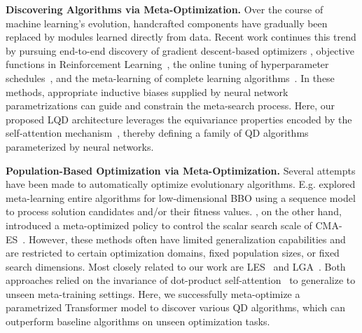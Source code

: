 \textbf{Discovering Algorithms via Meta-Optimization.}
Over the course of machine learning’s evolution, handcrafted components have gradually been replaced by modules learned directly from data.
Recent work continues this trend by pursuing end-to-end discovery of gradient descent-based optimizers \citep{bengio_1992, andrychowicz_2016, metz2019understanding}, objective functions in Reinforcement Learning~\citep{oh2020discovering,xu2020meta,lu2022discovered}, the online tuning of hyperparameter schedules~\citep{xu2018meta,zahavy2020self,parker2022automated}, and the meta-learning of complete learning algorithms~\citep{wang2016learning,kirsch2021meta,kirsch2022introducing}.
In these methods, appropriate inductive biases supplied by neural network parametrizations can guide and constrain the meta-search process. Here, our proposed LQD architecture leverages the equivariance properties encoded by the self-attention mechanism~\citep{lee2019set,kossen2021self,tang_SensoryNeuronTransformer_2021}, thereby defining a family of QD algorithms parameterized by neural networks.

\textbf{Population-Based Optimization via Meta-Optimization.}
Several attempts have been made to automatically optimize evolutionary algorithms. E.g. \citet{chen_2017,tv2019meta, gomes2021meta} explored meta-learning entire algorithms for low-dimensional BBO using a sequence model to process solution candidates and/or their fitness values. \citet{shala2020learning}, on the other hand, introduced a meta-optimized policy to control the scalar search scale of CMA-ES~\citep{hansen2001completely}. However, these methods often have limited generalization capabilities and are restricted to certain optimization domains, fixed population sizes, or fixed search dimensions.
Most closely related to our work are LES~\citep{lange_DiscoveringEvolutionStrategies_2023} and LGA~\citep{lange_DiscoveringAttentionBasedGenetic_2023}. Both approaches relied on the invariance of dot-product self-attention~\citep{lee2019set,tang_SensoryNeuronTransformer_2021} to generalize to unseen meta-training settings.
Here, we successfully meta-optimize a parametrized Transformer model to discover various QD algorithms, which can outperform baseline algorithms on unseen optimization tasks. 
